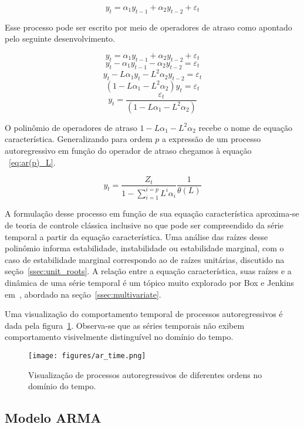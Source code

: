 $$ y_t = \alpha_1 y_{t-1} + \alpha_2 y_{t-2} + \varepsilon_t$$

Esse processo pode ser escrito por meio de operadores de atraso como apontado
pelo seguinte desenvolvimento.

$$ y_t = \alpha_1 y_{t-1} + \alpha_2 y_{t-2} + \varepsilon_t$$
$$ y_t - \alpha_1 y_{t-1} - \alpha_2 y_{t-2} = \varepsilon_t$$
$$ y_t - L\alpha_1 y_{t} - L^2\alpha_2 y_{t-2} = \varepsilon_t$$
$$ (1 - L\alpha_1 - L^2\alpha_2)y_t= \varepsilon_t$$
$$ y_t= \frac{\varepsilon_t}{(1 - L\alpha_1 - L^2\alpha_2)}$$

O polinômio de operadores de atraso $1 - L\alpha_1 - L^2\alpha_2$ recebe o
nome de equação característica. Generalizando para ordem $p$ a expressão de um
processo autoregressivo em função do operador de atraso chegamos à equação
~\ref{eq:ar(p)_L}.

\begin{equation}\label{eq:ar(p)_L}
    y_t = \frac{Z_t}{1 - \sum_{i=1}^{i=p} L^i \alpha_i} \frac{1}{\theta(L)}
\end{equation}

A formulação desse processo em função de sua equação característica aproxima-se
de teoria de controle clássica inclusive no que pode ser compreendido da série
temporal a partir da equação característica. Uma análise das raízes desse
polinômio informa estabilidade, instabilidade ou estabilidade marginal, com o
caso de estabilidade marginal correspondo ao de raízes unitárias, discutido na
seção~\ref{ssec:unit_roots}. A relação entre a equação característica, suas
raízes e a dinâmica de uma série temporal é um tópico muito explorado por
Box e Jenkins em~\cite{box}, abordado na seção~\ref{ssec:multivariate}.

Uma visualização do comportamento temporal de processos autoregressivos é dada
pela figura~\ref{fig:ar_time_visualization}. Observa-se que as séries temporais
não exibem comportamento visivelmente distinguível no domínio do tempo.

\begin{figure}[H]
    \centering
    \texttt{[image: figures/ar\_time.png]}
    \caption{Visualização de processos autoregressivos de diferentes ordens
    no domínio do tempo.}
    \label{fig:ar_time_visualization}
\end{figure}

\subsection{Modelo ARMA}
\label{ssec:ARMA}

